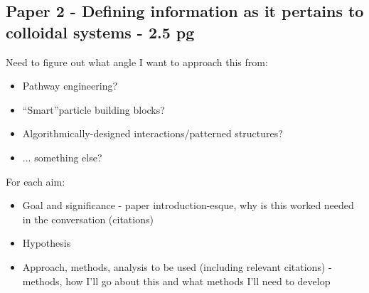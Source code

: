 \subsection{Paper 2 - Defining information as it pertains to colloidal systems - 2.5 pg}


Need to figure out what angle I want to approach this from:
\begin{itemize}
\item Pathway engineering?
\item``Smart''particle building blocks?
\item Algorithmically-designed interactions/patterned structures?
\item ... something else?
\end{itemize}


For each aim:
\begin{itemize}
\item Goal and significance - paper introduction-esque, why is this worked needed in the conversation (citations)
\item Hypothesis
\item Approach, methods, analysis to be used (including relevant citations) - methods, how I'll go about this and what methods I'll need to develop
\end{itemize}
